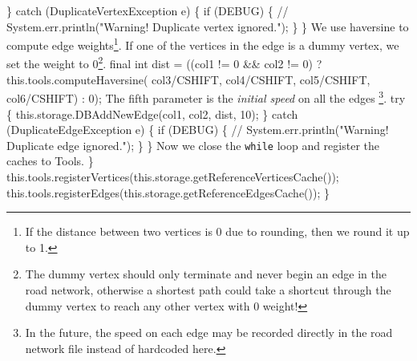 \} catch (DuplicateVertexException e) \{
  if (DEBUG) \{
    // System.err.println("Warning! Duplicate vertex ignored.");
  \}
\}
\nwendcode{}\nwdocspar
{\small We use haversine to compute edge weights\footnote{If the distance between two
vertices is 0 due to rounding, then we round it up to 1.}.  If one of the
vertices in the edge is a dummy vertex, we set the weight to 0\footnote{The
dummy vertex should only terminate and never begin an edge in the road network,
otherwise a shortest path could take a shortcut through the dummy vertex to
reach any other vertex with 0 weight!}.}
\nwenddocs{}\plusendmoddef
final int dist = ((col1 != 0 && col2 != 0)
  ? this.tools.computeHaversine(
        col3/CSHIFT, col4/CSHIFT,
        col5/CSHIFT, col6/CSHIFT) : 0);
\nwendcode{}\nwdocspar
{\small The fifth parameter is the \textit{initial speed} on all the edges
\footnote{In the future, the speed on each edge may be recorded directly in the
road network file instead of hardcoded here.}.}
\nwenddocs{}\plusendmoddef
try \{
  this.storage.DBAddNewEdge(col1, col2, dist, 10);
\} catch (DuplicateEdgeException e) \{
  if (DEBUG) \{
    // System.err.println("Warning! Duplicate edge ignored.");
  \}
\}
\nwendcode{}\nwdocspar
{\small Now we close the {\tt{}while} loop and register the caches to Tools.}
\nwenddocs{}\plusendmoddef
  \}
  this.tools.registerVertices(this.storage.getReferenceVerticesCache());
  this.tools.registerEdges(this.storage.getReferenceEdgesCache());
\}
\nwendcode{}\nwdocspar

